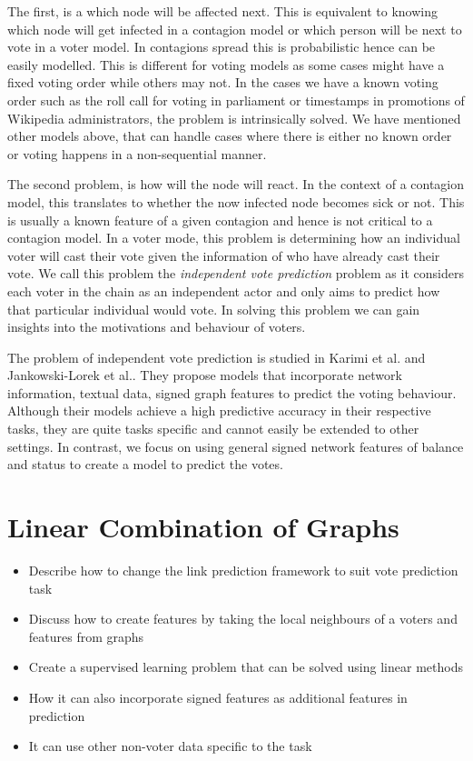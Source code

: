 The first, is a which node will be affected next. This is equivalent to knowing which node will get infected in a contagion model or which person will be next to vote in a voter model. In contagions spread this is probabilistic hence can be easily modelled. This is different for voting models as some cases might have a fixed voting order while others may not. In the cases we have a known voting order such as the roll call for voting in parliament or timestamps in promotions of Wikipedia administrators, the problem is intrinsically solved. We have mentioned other models above, that can handle cases where there is either no known order or voting happens in a non-sequential manner. 

The second problem, is how will the node will react. In the context of a contagion model, this translates to whether the now infected node becomes sick or not. This is usually a known feature of a given contagion and hence is not critical to a contagion model. In a voter mode, this problem is determining how an individual voter will cast their vote given the information of who have already cast their vote. We call this problem the \textit{independent vote prediction} problem as it considers each voter in the chain as an independent actor and only aims to predict how that particular individual would vote. In solving this problem we can gain insights into the motivations and behaviour of voters. 

The problem of independent vote prediction is studied in Karimi et al. \cite{karimi2019multicongress} and Jankowski-Lorek et al.\cite{jankowski-lorek2013MBSN}. They propose models that incorporate network information, textual data, signed graph features to predict the voting behaviour. Although their models achieve a high predictive accuracy in their respective tasks, they are quite tasks specific and cannot easily be extended to other settings. In contrast, we focus on using general signed network features of balance and status to create a model to predict the votes. 

\section{Linear Combination of Graphs}
\label{sec:linear-combination-theory}
\begin{itemize}
    \item Describe how to change the link prediction framework to suit vote prediction task
    \item Discuss how to create features by taking the local neighbours of a voters and features from graphs 
    \item Create a supervised learning problem that can be solved using linear methods
    \item How it can also incorporate signed features as additional features in prediction
    \item It can use other non-voter data specific to the task
\end{itemize}


